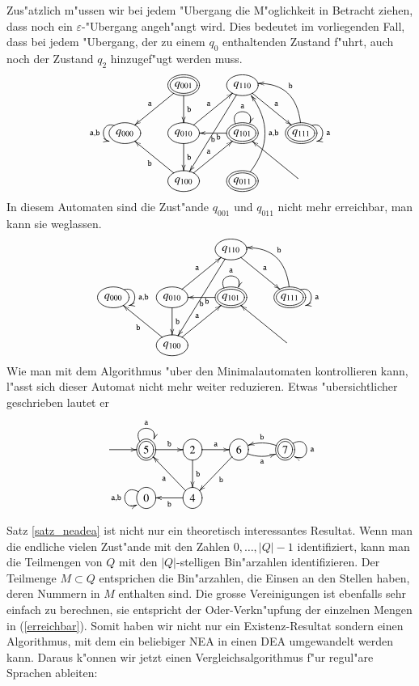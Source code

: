 Zus"atzlich m"ussen wir bei jedem "Ubergang die M"oglichkeit in
Betracht ziehen, dass noch ein $\varepsilon$-"Ubergang angeh"angt
wird. Dies bedeutet im vorliegenden Fall, dass bei jedem "Ubergang,
der zu einem $q_0$ enthaltenden Zustand f"uhrt, auch noch der
Zustand $q_2$ hinzugef"ugt werden muss.
\[
\entrymodifiers={++[o][F]}
\xymatrix{
*+\txt{}
	&*++[o][F=]{q_{001}} \ar[d]^{\tt b}\ar[dl]_{\tt a}
		&{q_{110}}\ar[dr]^{\tt a} \ar[ddl]^{\tt b}
\\
{q_{000}}\ar@(ul,dl)_{{\tt a},{\tt b}}
	&{q_{010}} \ar[ur]^{\tt a} \ar[d]^{\tt b}
		&*++[o][F=]{q_{101}} \ar@(ul,ur)^{\tt a} \ar[l]^{\tt b}
			&*++[o][F=]{q_{111}}\ar@(ur,dr)^{{\tt a}} \ar@/_20pt/[ul]_{\tt b}
\\
*+\txt{}
	&{q_{100}}\ar[ur]^{\tt a} \ar[ul]^{\tt b}
		&*++[o][F=]{q_{011}} \ar@/_20pt/[uu]_{{\tt a},{\tt b}}
			&*+\txt{}\ar[ul]
}
\]
In diesem Automaten sind die Zust"ande $q_{001}$ und $q_{011}$ nicht
mehr erreichbar, man kann sie weglassen.
\[
\entrymodifiers={++[o][F]}
\xymatrix{
*+\txt{}
	&*+\txt{}
		&{q_{110}}\ar[dr]^{\tt a} \ar[ddl]^{\tt b}
\\
{q_{000}}\ar@(ur,dr)^{{\tt a},{\tt b}}
	&{q_{010}} \ar[ur]^{\tt a} \ar[d]^{\tt b}
		&*++[o][F=]{q_{101}} \ar@(ul,ur)^{\tt a} \ar[l]^{\tt b}
			&*++[o][F=]{q_{111}}\ar@(ur,dr)^{{\tt a}} \ar@/_20pt/[ul]_{\tt b}
\\
*+\txt{}
	&{q_{100}}\ar[ur]^{\tt a} \ar[ul]^{\tt b}
		&*+\txt{}
			&*+\txt{}\ar[ul]
}
\]
Wie man mit dem Algorithmus "uber den Minimalautomaten kontrollieren
kann, l"asst sich dieser Automat nicht mehr weiter reduzieren. Etwas
"ubersichtlicher geschrieben lautet er
\[
\entrymodifiers={++[o][F]}
\xymatrix{
*+\txt{}\ar[r]
	&*++[o][F=]{5}\ar@(ul,ur)^{\tt a} \ar[r]^{\tt b}
		&2\ar[r]^{\tt a} \ar[d]^{\tt b}
			&6\ar@/_/[r]_{\tt a} \ar[dl]^{\tt b}
				&*++[o][F=]{7}\ar@/_/[l]_{\tt b} \ar@(ur,dr)^{\tt a}
\\
*+\txt{}
	&0\ar@(ul,dl)_{{\tt a},{\tt b}}
		&4\ar[ul]^{\tt a} \ar[l]^{\tt b}
}
\]


Satz \ref{satz_neadea} ist nicht nur ein theoretisch interessantes
Resultat. Wenn man die endliche vielen Zust"ande mit den Zahlen
$0,\dots,|Q|-1$ identifiziert, kann man die Teilmengen von $Q$ mit
den $|Q|$-stelligen Bin"arzahlen identifizieren.
Der Teilmenge $M\subset Q$ entsprichen die Bin"arzahlen, die Einsen an
den Stellen haben, deren Nummern in $M$ enthalten sind.
Die grosse Vereinigungen ist ebenfalls sehr einfach
zu berechnen, sie entspricht der Oder-Verkn"upfung
der einzelnen Mengen in (\ref{erreichbar}).
Somit haben wir nicht nur ein Existenz-Resultat sondern einen
Algorithmus, mit dem ein beliebiger NEA in einen DEA umgewandelt
werden kann.
Daraus k"onnen wir jetzt einen Vergleichsalgorithmus f"ur regul"are
Sprachen ableiten: 

